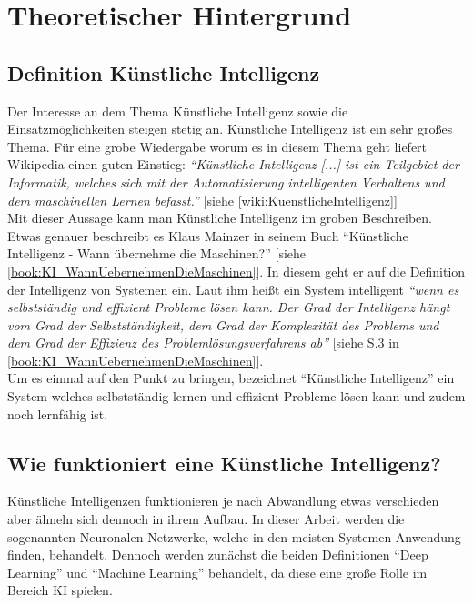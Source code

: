 \section{Theoretischer Hintergrund}
\label{sec:theorie}
    \subsection{Definition Künstliche Intelligenz}
    \label{subsec:definiton_kuenstliche_intelligenz}
    Der Interesse an dem Thema Künstliche Intelligenz sowie die Einsatzmöglichkeiten steigen stetig an. Künstliche Intelligenz ist ein sehr großes Thema. Für eine grobe Wiedergabe worum es in diesem Thema geht liefert Wikipedia einen guten Einstieg: 
    \textit{\enquote{Künstliche Intelligenz [...] ist ein Teilgebiet der Informatik, welches sich mit der Automatisierung intelligenten Verhaltens und dem maschinellen Lernen befasst.}} [siehe \ref{wiki:KuenstlicheIntelligenz}]\\

    Mit dieser Aussage kann man Künstliche Intelligenz im groben Beschreiben. Etwas genauer beschreibt es Klaus Mainzer in seinem Buch \enquote{Künstliche Intelligenz - Wann übernehme die Maschinen?} [siehe \ref{book:KI_WannUebernehmenDieMaschinen}]. In diesem geht er auf die Definition der Intelligenz von Systemen ein. Laut ihm heißt ein System intelligent \textit{\enquote{wenn es selbstständig und effizient Probleme lösen kann. Der Grad der Intelligenz hängt vom Grad der Selbstständigkeit, dem Grad der Komplexität des Problems und dem Grad der Effizienz des Problemlösungsverfahrens ab}} [siehe S.3 in \ref{book:KI_WannUebernehmenDieMaschinen}].\\
    
    Um es einmal auf den Punkt zu bringen, bezeichnet \enquote{Künstliche Intelligenz} ein System welches selbstständig lernen und effizient Probleme lösen kann und zudem noch lernfähig ist.

    \subsection{Wie funktioniert eine Künstliche Intelligenz?}
    \label{subsec:wie_funktioniert_eine_kuenstliche_intelligenz}
    Künstliche Intelligenzen funktionieren je nach Abwandlung etwas verschieden aber ähneln sich dennoch in ihrem Aufbau. In dieser Arbeit werden die sogenannten Neuronalen Netzwerke, welche in den meisten Systemen Anwendung finden, behandelt. Dennoch werden zunächst die beiden Definitionen \enquote{Deep Learning} und \enquote{Machine Learning} behandelt, da diese eine große Rolle im Bereich KI spielen.

